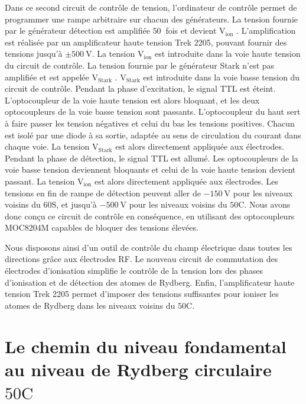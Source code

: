 Dans ce second circuit de contrôle de tension, l'ordinateur de contrôle permet de programmer une rampe arbitraire sur chacun des générateurs.
La tension fournie par le générateur \og détection \fg{} est amplifiée $\SI{50}{}$ fois et devient \og $\mathrm{V_{ion}}$ \fg{}.
L'amplification est réalisée par un amplificateur haute tension Trek 2205, pouvant fournir des tensions jusqu'à $\pm\SI{500}{\V}$.
La tension $\mathrm{V_{ion}}$ est introduite dans la voie haute tension du circuit de contrôle.
La tension fournie par le générateur \og Stark \fg{} n'est pas amplifiée et est appelée \og $\mathrm{V_{Stark}}$ \fg{}.
$\mathrm{V_{Stark}}$ est introduite dans la voie basse tension du circuit de contrôle.
Pendant la phase d'excitation, le signal TTL est éteint. L'optocoupleur de la voie haute tension est alors bloquant, et les deux optocoupleurs de la voie basse tension sont passants.
L'optocoupleur du haut sert à faire passer les tension négatives et celui du bas les tensions positives.
Chacun est isolé par une diode à sa sortie, adaptée au sens de circulation du courant dans chaque voie.
La tension $\mathrm{V_{Stark}}$ est alors directement appliquée aux électrodes.
Pendant la phase de détection, le signal TTL est allumé. Les optocoupleurs de la voie basse tension deviennent bloquants et celui de la voie haute tension devient passant.
La tension $\mathrm{V_{ion}}$ est alors directement appliquée aux électrodes.
Les tensions en fin de rampe de détection peuvent aller de $\SI{-150}{\V}$ pour les niveaux voisins du $\mathrm{60S}$, et jusqu'à $\SI{-500}{\V}$ pour les niveaux voisins du $\mathrm{50C}$.
Nous avons donc conçu ce circuit de contrôle en conséquence, en utilisant des optocoupleurs MOC8204M capables de bloquer des tensions élevées.

Nous disposons ainsi d'un outil de contrôle du champ électrique dans toutes les directions grâce aux électrodes RF.
Le nouveau circuit de commutation des électrodes d'ionisation simplifie le contrôle de la tension lors des phases d'ionisation et de détection des atomes de Rydberg.
Enfin, l'amplificateur haute tension Trek 2205 permet d'imposer des tensions suffisantes pour ioniser les atomes de Rydberg dans les niveaux voisins du $\mathrm{50C}$.


\section{Le chemin du niveau fondamental au niveau de Rydberg circulaire $\mathrm{50C}$}
